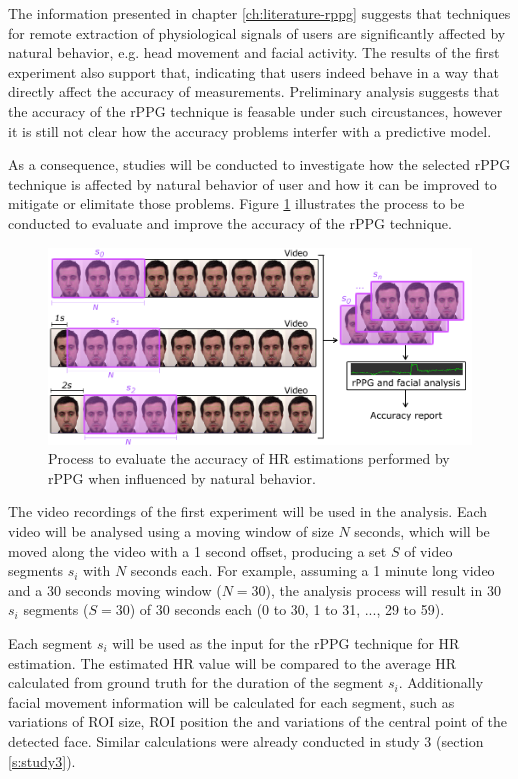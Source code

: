 The information presented in chapter \ref{ch:literature-rppg} suggests that techniques for remote extraction of physiological signals of users are significantly affected by natural behavior, e.g. head movement and facial activity. The results of the first experiment also support that, indicating that users indeed behave in a way that directly affect the accuracy of measurements. Preliminary analysis \parencite{bevilacqua2017accuracy} suggests that the accuracy of the rPPG technique is feasable under such circustances, however it is still not clear how the accuracy problems interfer with a predictive model.

As a consequence, studies will be conducted to investigate how the selected rPPG technique is affected by natural behavior of user and how it can be improved to mitigate or elimitate those problems. Figure \ref{fig:rppg-accuracy-study} illustrates the process to be conducted to evaluate and improve the accuracy of the rPPG technique.

\begin{figure}[h]
    \centering
    \includegraphics[width=\textwidth]{figures/rppg-accuracy-study}
    \caption{Process to evaluate the accuracy of HR estimations performed by rPPG when influenced by natural behavior.}
    \label{fig:rppg-accuracy-study}
\end{figure}

The video recordings of the first experiment will be used in the analysis. Each video will be analysed using a moving window of size $N$ seconds, which will be moved along the video with a 1 second offset, producing a set $S$ of video segments $s_i$ with $N$ seconds each. For example, assuming a 1 minute long video and a 30 seconds moving window ($N=30$), the analysis process will result in 30 $s_i$ segments ($S=30$) of 30 seconds each (0 to 30, 1 to 31, ..., 29 to 59).

Each segment $s_i$ will be used as the input for the rPPG technique for HR estimation. The estimated HR value will be compared to the average HR calculated from ground truth for the duration of the segment $s_i$. Additionally facial movement information will be calculated for each segment, such as variations of ROI size, ROI position the and variations of the central point of the detected face. Similar calculations were already conducted in study 3 (section \ref{s:study3}).

